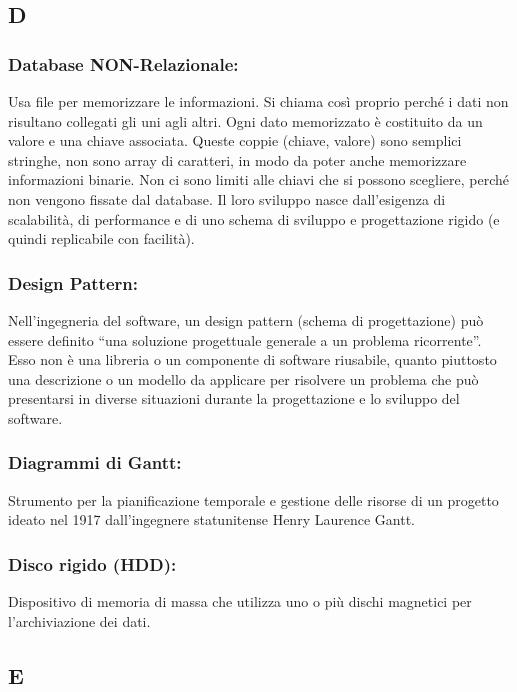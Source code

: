 \subsection*{\huge{D}}

\subsubsection*{Database NON-Relazionale:} Usa file per memorizzare le
informazioni. Si chiama cos\`i proprio perch\'e i dati non risultano collegati
gli uni agli altri. Ogni dato memorizzato \`e costituito da un valore e una
chiave associata. Queste coppie (chiave, valore) sono semplici stringhe, non
sono array di caratteri, in modo da poter anche memorizzare informazioni binarie. Non ci
sono limiti alle chiavi che si possono scegliere, perch\'e non vengono fissate
dal database. Il loro sviluppo nasce dall'esigenza di scalabilit\`a, di performance
e di uno schema di sviluppo e progettazione rigido (e quindi replicabile con
facilit\`a).

\subsubsection*{Design Pattern:}
Nell'ingegneria del software, un design pattern (schema di progettazione) pu\`o
essere definito ``una soluzione progettuale generale a un problema ricorrente''.
Esso non \`e una libreria o un componente di software riusabile, quanto
piuttosto una descrizione o un modello da applicare per risolvere un problema
che pu\`o presentarsi in diverse situazioni durante la progettazione e lo
sviluppo del software.

\subsubsection*{Diagrammi di Gantt:} Strumento per la pianificazione temporale e
gestione delle risorse di un progetto ideato nel 1917 dall'ingegnere
statunitense Henry Laurence Gantt.

\subsubsection*{Disco rigido (HDD):} Dispositivo di memoria di massa che
utilizza uno o pi\`u dischi magnetici per l'archiviazione dei dati.

\subsection*{\huge{E}}

